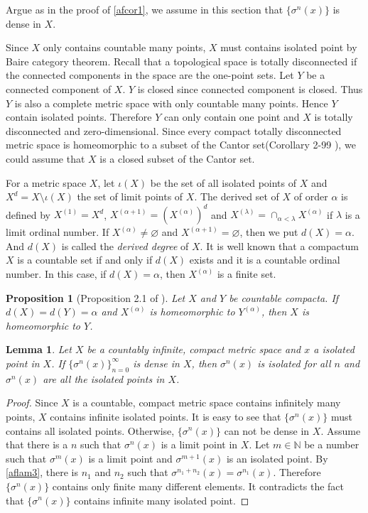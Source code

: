 \documentclass[a4paper,10pt]{amsart}
\newtheorem{proposition}{Proposition}[section]
\newtheorem{lemma}{Lemma}[section]
\newcommand{\N}{\mathbb N} %
\begin{document}
Argue as in the proof of \cref{afcor1}, we assume in this
section that $\{\sigma^{n}(x)\}$ is dense in $X$.

Since $X$ only contains countable many points, $X$ must contains
isolated point by Baire category theorem.
Recall that a topological space is totally disconnected if 
the connected components in the space are the one-point sets.
Let $Y$ be a connected component of $X$. $Y$ is closed since
connected component is closed. Thus $Y$ is also a complete metric space
with only countable many points. Hence $Y$ contain isolated points.
Therefore $Y$ can only contain one point and $X$ is totally disconnected 
and zero-dimensional. Since every compact totally disconnected metric space
is homeomorphic to a subset of the Cantor set(Corollary 2-99 \cite{JG}),
we could assume that $X$ is a closed subset of the Cantor set.


For a metric space $X$, let $\iota(X)$ be the set of 
all isolated points of $X$ and $X^{d} = X \setminus \iota(X)$
the set of limit points of $X$.
The derived set of $X$ of order $\alpha$ is defined by 
$X^{(1)} = X^{d}$, $X^{(\alpha+1)} = (X^{(\alpha)})^{d}$ and
$X^{(\lambda)} = \cap_{\alpha < \lambda}X^{(\alpha)}$ if
$\lambda$ is a limit ordinal number. If $X^{(\alpha)} \neq \varnothing$
and $X^{(\alpha + 1)} = \varnothing$, then we put $d(X) = \alpha$.
And $d(X)$ is called the \textit{derived degree} of $X$. It is 
well known that a compactum $X$ is a countable set if and only if
$d(X)$ exists and it is a countable ordinal number. In this case,
if $d(X) = \alpha$, then $X^{(\alpha)}$ is a finite set.

\begin{proposition}[Proposition 2.1 of \cite{HJ}]
    Let $X$ and $Y$ be countable compacta. If $d(X) = d(Y) = \alpha$ and
    $X^{(\alpha)}$ is homeomorphic to $Y^{(\alpha)}$, then $X$ is 
    homeomorphic to $Y$.
\end{proposition}


\begin{lemma} \label{c_lem1}
   Let $X$ be a countably infinite, compact metric space and 
   $x$ a isolated point in $X$. If $\{ \sigma^{n}(x) \}_{n=0}^{\infty}$ 
   is dense in $X$, then $\sigma^{n}(x)$ is isolated for all $n$ and
   $\sigma^{n}(x)$ are all the isolated points in $X$.
\end{lemma}

\begin{proof}
   Since $X$ is a countable, compact metric space contains infinitely many
   points, $X$ contains infinite isolated points. 
   It is easy to see that $\{\sigma^{n}(x)\}$ must contains all 
   isolated points. Otherwise, $\{\sigma^{n}(x)\}$ can not be dense
   in $X$. Assume that there is a $n$ such that $\sigma^{n}(x)$ is a 
   limit point in $X$. Let $m \in \N$ be a number such that 
   $\sigma^{m}(x)$ is a limit point and $\sigma^{m+1}(x)$ is an
   isolated point. By \cref{aflam3}, there is $n_1$ and $n_2$ such that 
   $\sigma^{n_1 + n_2}(x) = \sigma^{n_1}(x)$. Therefore $\{\sigma^{n}(x)\}$
   contains only finite many different elements. It contradicts the
   fact that $\{\sigma^{n}(x)\}$ contains infinite many isolated point. 
\end{proof}
\end{document}
